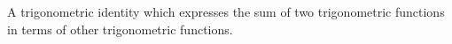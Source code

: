 A trigonometric identity which expresses the sum of two trigonometric
functions in terms of other trigonometric functions.